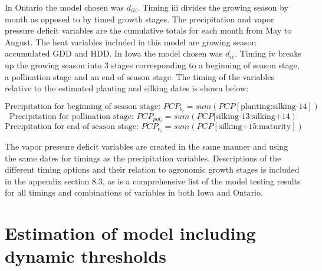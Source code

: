 In Ontario the model chosen was $d_{iii}$. Timing iii divides the growing season by month as opposed to by timed growth stages. The precipitation and vapor pressure deficit variables are the cumulative totals for each month from May to August. The heat variables included in this model are growing season accumulated GDD and HDD. In Iowa the model chosen was $d_{iv}$. Timing iv breaks up the growing season into 3 stages corresponding to a beginning of season stage, a pollination stage and an end of season stage. The timing of the variables relative to the estimated planting and silking dates is shown below: 

$$\text{Precipitation for beginning of season stage: }PCP_{b_i}=sum(PCP[\text{planting:silking-14}])$$
$$\text{Precipitation for pollination stage: }PCP_{pol_i}=sum(PCP[\text{silking-13:silking+14})$$
$$\text{Precipitation for end of season stage: }PCP_{e_i}=sum(PCP[\text{silking+15:maturity}])$$

The vapor pressure deficit variables are created in the same manner and using the same dates for timings as the precipitation variables. Descriptions of the different timing options and their relation to agronomic growth stages is included in the appendix section 8.3, as is a comprehensive list of the model testing results for all timings and combinations of variables in both Iowa and Ontario.

\section{Estimation of model including dynamic thresholds}

